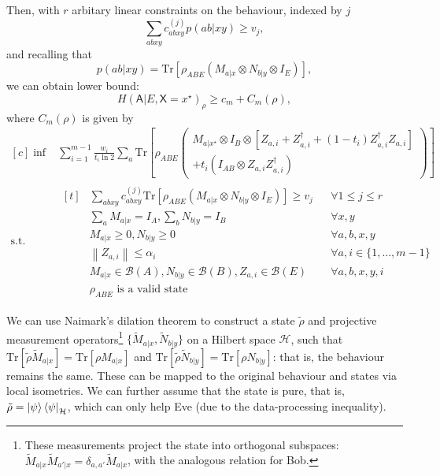 \documentclass[10pt, a4paper]{article}
\numberwithin{equation}{section} %
\theoremstyle{definition}
\theoremstyle{plain}
\newcommand{\norm}[1]{\left\lVert#1\right\rVert}
\newcommand{\dintv}[2]{\mathopen\{#1,\ldots,#2\mathclose\}}
\newcommand{\?}{\mathrel{?}} %
\newcommand{\Tr}{\mathrm{Tr}} %
\newcommand{\Hs}{\mathcal{H}} %
\newcommand{\sB}{\mathcal{B}}
\newcommand{\crv}[1]{\mathsf{#1}}
\begin{document}
      Then, with \(r\) arbitary linear constraints on the behaviour, indexed by \(j\)
      \[ \sum_{abxy} c^{(j)}_{abxy} p(ab|xy) \geq v_j, \]
      and recalling that
      \[ p(ab|xy) = \Tr\left[\rho_{A B E} \left(M_{a|x} \otimes N_{b|y} \otimes I_{E}\right) \right], \]
      we can obtain lower bound:
      \begin{equation}
        H{(\crv{A}|E, \crv{X}=x^{\star})}_{\rho} \geq c_m + C_m(\rho),
      \end{equation}
      where \(C_m(\rho)\) is given by
      \begin{equation}
        \begin{aligned}[c]
          \inf & \sum_{i=1}^{m-1} \frac{w_i}{t_i \ln 2} \sum_a \Tr\left[ 
            \rho_{A B E} \left(
            \begin{gathered}
            M_{a|x^{\star}} \otimes I_{B} \otimes \left[ Z_{a,i} + Z_{a,i}^{\dagger} + (1-t_i)  Z_{a,i}^{\dagger}Z_{a,i} \right] \\
            + t_i \left( I_{A B} \otimes Z_{a,i}Z_{a,i}^{\dagger}\right) 
            \end{gathered}
            \right)
          \right] \\
          \text{s.t.} & \begin{aligned}[t] 
            & \sum_{abxy} c^{(j)}_{abxy} \Tr\left[\rho_{A B E} \left(M_{a|x} \otimes N_{b|y} \otimes I_{E}\right) \right] \geq v_j & & \forall 1 \leq j \leq r \\
            & \sum_{a} M_{a|x} = I_{A}, \sum_{b} N_{b|y} = I_{B} & & \forall x, y \\
            & M_{a|x} \geq 0, N_{b|y} \geq 0 & & \forall a, b, x, y \\
            & \norm{Z_{a,i}} \leq \alpha_i & & \forall a, i \in \dintv{1}{m-1} \\
            & M_{a|x} \in \sB(A), N_{b|y} \in \sB(B), Z_{a,i} \in \sB(E) & & \forall a, b, x, y, i \\
            & \rho_{A B E} \text{ is a valid state} & &
          \end{aligned}
        \end{aligned}
      \end{equation}

      We can use Naimark's dilation theorem to construct a state \(\tilde{\rho}\) and projective measurement operators\footnote{These measurements project the state into orthogonal subspaces: \(\tilde{M}_{a|x}\tilde{M}_{a'|x} = \delta_{a,a'}\tilde{M}_{a|x}\), with the analogous relation for Bob.} \(\{\tilde{M}_{a|x}, \tilde{N}_{b|y}\}\) on a Hilbert space \(\Hs\), such that \(\Tr\left[\tilde{\rho}\tilde{M}_{a|x}\right] = \Tr\left[\rho M_{a|x}\right]\) and  \(\Tr\left[\tilde{\rho}\tilde{N}_{b|y}\right] = \Tr\left[\rho N_{b|y}\right]\): that is, the behaviour remains the same. These can be mapped to the original behaviour and states via local isometries. We can further assume that the state is pure, that is, \(\tilde{\rho} = {\ket{\psi}\bra{\psi}}_{\Hs}\), which can only help Eve (due to the data-processing inequality).
\end{document}
